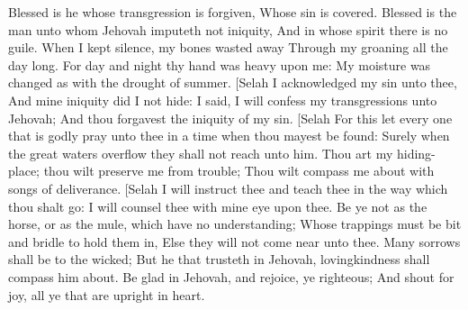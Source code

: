 Blessed is he whose transgression is forgiven, Whose sin is covered.  Blessed is the man unto whom Jehovah imputeth not iniquity, And in whose spirit there is no guile.  When I kept silence, my bones wasted away Through my groaning all the day long.  For day and night thy hand was heavy upon me: My moisture was changed as with the drought of summer. [Selah  I acknowledged my sin unto thee, And mine iniquity did I not hide: I said, I will confess my transgressions unto Jehovah; And thou forgavest the iniquity of my sin. [Selah  For this let every one that is godly pray unto thee in a time when thou mayest be found: Surely when the great waters overflow they shall not reach unto him.  Thou art my hiding-place; thou wilt preserve me from trouble; Thou wilt compass me about with songs of deliverance. [Selah  I will instruct thee and teach thee in the way which thou shalt go: I will counsel thee with mine eye upon thee.  Be ye not as the horse, or as the mule, which have no understanding; Whose trappings must be bit and bridle to hold them in, Else they will not come near unto thee.  Many sorrows shall be to the wicked; But he that trusteth in Jehovah, lovingkindness shall compass him about.  Be glad in Jehovah, and rejoice, ye righteous; And shout for joy, all ye that are upright in heart. 

